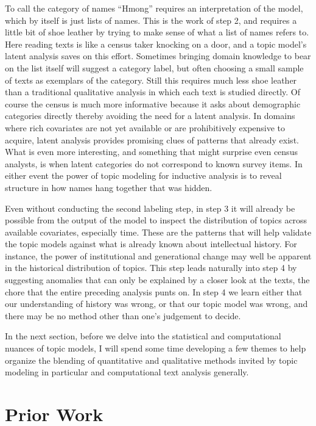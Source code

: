 \documentclass[]{book}
\theoremstyle{definition}
\theoremstyle{definition}
\theoremstyle{definition}
\theoremstyle{remark}
\begin{document}
To call the category of names ``Hmong'' requires an interpretation of
the model, which by itself is just lists of names. This is the work of
step 2, and requires a little bit of shoe leather by trying to make
sense of what a list of names refers to. Here reading texts is like a
census taker knocking on a door, and a topic model's latent analysis
saves on this effort. Sometimes bringing domain knowledge to bear on the
list itself will suggest a category label, but often choosing a small
sample of texts as exemplars of the category. Still this requires much
less shoe leather than a traditional qualitative analysis in which each
text is studied directly. Of course the census is much more informative
because it asks about demographic categories directly thereby avoiding
the need for a latent analysis. In domains where rich covariates are not
yet available or are prohibitively expensive to acquire, latent analysis
provides promising clues of patterns that already exist. What is even
more interesting, and something that might surprise even census
analysts, is when latent categories do not correspond to known survey
items. In either event the power of topic modeling for inductive
analysis is to reveal structure in how names hang together that was
hidden.

Even without conducting the second labeling step, in step 3 it will
already be possible from the output of the model to inspect the
distribution of topics across available covariates, especially time.
These are the patterns that will help validate the topic models against
what is already known about intellectual history. For instance, the
power of institutional and generational change may well be apparent in
the historical distribution of topics. This step leads naturally into
step 4 by suggesting anomalies that can only be explained by a closer
look at the texts, the chore that the entire preceding analysis punts
on. In step 4 we learn either that our understanding of history was
wrong, or that our topic model was wrong, and there may be no method
other than one's judgement to decide.

In the next section, before we delve into the statistical and
computational nuances of topic models, I will spend some time developing
a few themes to help organize the blending of quantitative and
qualitative methods invited by topic modeling in particular and
computational text analysis generally.

\hypertarget{kd-lit}{%
\section{Prior Work}\label{kd-lit}}
\end{document}
